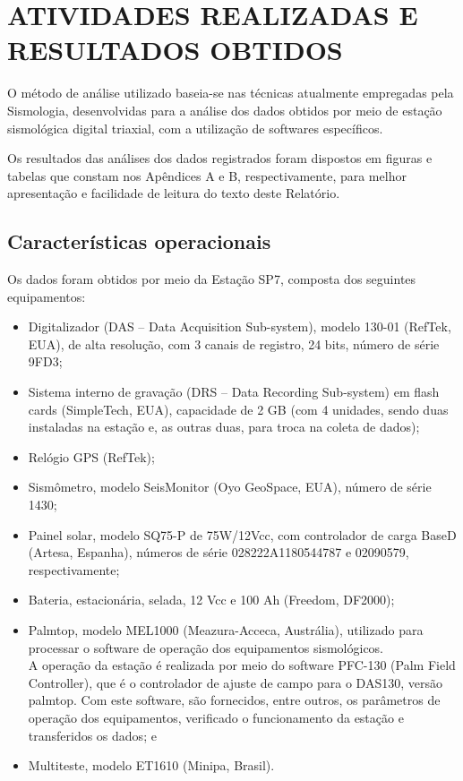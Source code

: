 \section{ATIVIDADES REALIZADAS E RESULTADOS OBTIDOS}
\label{sec:ativ_real}
\par{O método de análise utilizado baseia-se nas técnicas atualmente empregadas pela Sismologia, desenvolvidas para a análise dos dados obtidos por meio de estação sismológica digital triaxial, com a utilização de softwares específicos.}

\par{Os resultados das análises dos dados registrados foram dispostos em figuras e tabelas que constam nos Apêndices A e B, respectivamente, para melhor apresentação e facilidade de leitura do texto deste Relatório.}

\subsection{Características operacionais}
\label{subsec:caracteristicas}
\par{Os dados foram obtidos por meio da Estação SP7, composta dos seguintes equipamentos:}
\begin{itemize}
    \item Digitalizador (DAS – Data Acquisition Sub-system), modelo 130-01 (RefTek, EUA), de alta resolução, com 3 canais de registro, 24 bits, número de série 9FD3;
    \item Sistema interno de gravação (DRS – Data Recording Sub-system) em flash cards (SimpleTech, EUA), capacidade de 2 GB (com 4 unidades, sendo duas instaladas na estação e, as outras duas, para troca na coleta de dados);
    \item Relógio GPS (RefTek);
    \item Sismômetro, modelo SeisMonitor (Oyo GeoSpace, EUA), número de série 1430;
    \item Painel solar, modelo SQ75-P de 75W/12Vcc, com controlador de carga BaseD (Artesa, Espanha), números de série 028222A1180544787 e 02090579, respectivamente;
    \item Bateria, estacionária, selada, 12 Vcc e 100 Ah (Freedom, DF2000);
    \item Palmtop, modelo MEL1000 (Meazura-Acceca, Austrália), utilizado para processar o software de operação dos equipamentos sismológicos. \\
A operação da estação é realizada por meio do software PFC-130 (Palm Field Controller), que é o controlador de ajuste de campo para o DAS130, versão palmtop. Com este software, são fornecidos, entre outros, os parâmetros de operação dos equipamentos, verificado o funcionamento da estação e transferidos os dados; e
    \item Multiteste, modelo ET1610 (Minipa, Brasil).
\end{itemize}

